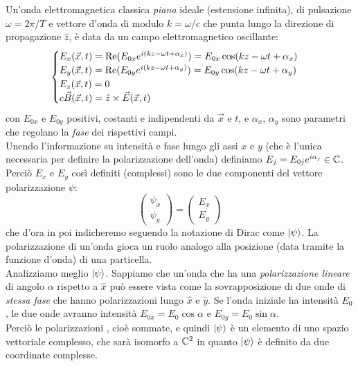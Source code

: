 \documentclass[FisicaTeorica.tex]{subfiles}
\begin{document}
Un'onda elettromagnetica classica \textit{piana} ideale (estensione infinita), di pulsazione $\omega = 2\pi/T$ e vettore d'onda di modulo $k = \omega/c$ che punta lungo la direzione di propagazione $\hat{z}$, è data da un campo elettromagnetico oscillante:
\[
\begin{cases}
E_x(\vec{x},t) = \operatorname{Re}(E_{0x} e^{i(kz-\omega t + \alpha_x)}) = E_{0x}\cos(kz-\omega t+\alpha_x)\\
E_y(\vec{x},t) = \operatorname{Re}(E_{0y} e^{i(kz-\omega t + \alpha_y)}) = E_{0y}\cos(kz-\omega t+\alpha_y)\\
E_z(\vec{x},t) = 0\\
c \vec{B}(\vec{x},t) = \hat{z} \times \vec{E}(\vec{x},t)
\end{cases}
\]
con $E_{0x}$ e $E_{0y}$ positivi, costanti e indipendenti da $\vec{x}$ e $t$, e $\alpha_x$, $\alpha_y$ sono parametri che regolano la \textit{fase} dei rispettivi campi.\\
Unendo l'informazione su intensità e fase lungo gli assi $x$ e $y$ (che è l'unica necessaria per definire la polarizzazione dell'onda) definiamo $E_j = E_{0j} e^{i\alpha_j} \in \mathbb{C}$. Perciò $E_x$ e $E_y$ così definiti (complessi) sono le due componenti del vettore  polarizzazione $\psi$:
\[
\begin{pmatrix}
\psi_x\\ \psi_y
\end{pmatrix} = \begin{pmatrix}
E_x\\
E_y
\end{pmatrix}
\]
che d'ora in poi indicheremo seguendo la notazione di Dirac come $\ket{\psi}$. La polarizzazione di un'onda gioca un ruolo analogo alla posizione (data tramite la funzione d'onda) di una particella.\\
Analizziamo meglio $\ket{\psi}$. Sappiamo che un'onda che ha una \textit{polarizzazione lineare} di angolo $\alpha$ rispetto a $\hat{x}$ può essere vista come la sovrapposizione di due onde di \textit{stessa fase} che hanno polarizzazioni lungo $\hat{x}$ e $\hat{y}$. Se l'onda iniziale ha intensità $E_0$, le due onde  avranno intensità $E_{0x} = E_0\cos\alpha$ e $E_{0y} = E_0\sin\alpha$.\\ %
Perciò le polarizzazioni , cioè sommate, e quindi $\ket{\psi}$ è un elemento di uno spazio vettoriale complesso, che sarà isomorfo a $\mathbb{C}^2$ in quanto $\ket{\psi}$ è definito da due coordinate complesse.\\
\end{document}
